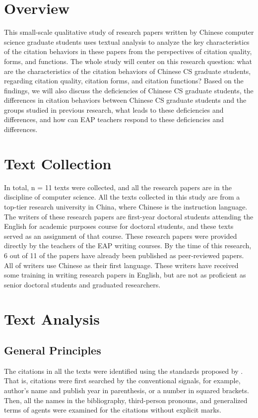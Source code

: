 \label{chap:methods}

\section{Overview}
This small-scale qualitative study of research papers written by Chinese computer science graduate students uses textual analysis to analyze the key characteristics of the citation behaviors in these papers from the perspectives of citation quality, forms, and functions. The whole study will center on this research question: what are the characteristics of the citation behaviors of Chinese CS graduate students, regarding citation quality, citation forms, and citation functions? Based on the findings, we will also discuss the deficiencies of Chinese CS graduate students, the differences in citation behaviors between Chinese CS graduate students and the groups studied in previous research, what leads to these deficiencies and differences, and how can EAP teachers respond to these deficiencies and differences.

\section{Text Collection}
In total, n = 11 texts were collected, and all the research papers are in the discipline of computer science. All the texts collected in this study are from a top-tier research university in China, where Chinese is the instruction language. The writers of these research papers are first-year doctoral students attending the English for academic purposes course for doctoral students, and these texts served as an assignment of that course. These research papers were provided directly by the teachers of the EAP writing courses. By the time of this research, 6 out of 11 of the papers have already been published as peer-reviewed papers. All of writers use Chinese as their first language. These writers have received some training in writing research papers in English, but are not as proficient as senior doctoral students and graduated researchers.

\section{Text Analysis}
\subsection{General Principles}
The citations in all the texts were identified using the standards proposed by \citet{hyland_academic_1999}. That is, citations were first searched by the conventional signals, for example, author’s name and publish year in parenthesis, or a number in squared brackets. Then, all the names in the bibliography, third-person pronouns, and generalized terms of agents were examined for the citations without explicit marks.

